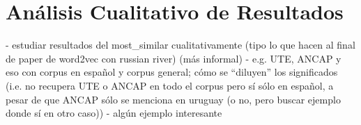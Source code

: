 \section{Análisis Cualitativo de Resultados}

- estudiar resultados del most\_similar cualitativamente (tipo lo que hacen al final de paper de word2vec con russian river)
  (más informal)
- e.g. UTE, ANCAP y eso con corpus en español y corpus general; cómo se ``diluyen'' los significados (i.e. no recupera UTE o ANCAP en todo el corpus pero sí sólo en español, a pesar de que ANCAP sólo se menciona en uruguay (o no, pero buscar ejemplo donde sí en otro caso))
- algún ejemplo interesante
